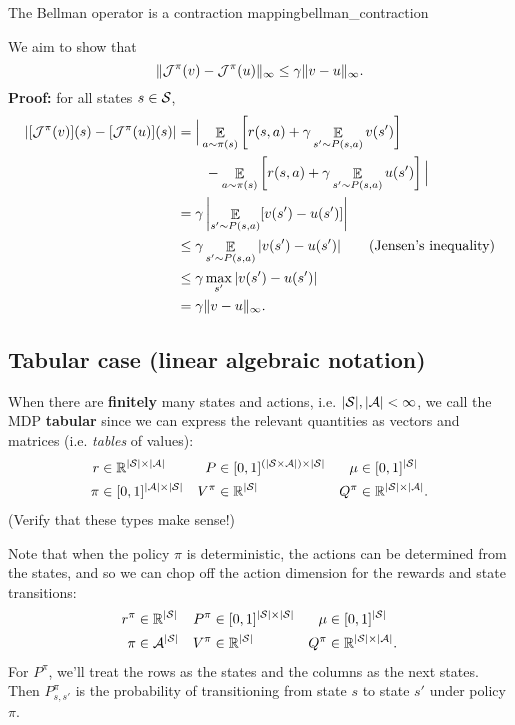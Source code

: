 \documentclass[../main/main]{subfiles}
\begin{document}
\begin{theorem}{The Bellman operator is a contraction mapping}{bellman_contraction}

We aim to show that
\[
    \|\bop^{\pi} (v) - \bop^{\pi} (u) \|_{\infty} \le \gamma \|v - u \|_{\infty}.
\]
\textbf{Proof:} for all states $s \in \S$,
\begin{align*}
|[\bop^{\pi} (v)](s) - [\bop^{\pi} (u)](s)|&= \Big| \mathop{\mathbb{E}}_{a \sim \pi(s)} \left[ r(s, a) + \gamma \mathop{\mathbb{E}}_{s' \sim P(s, a)} v(s') \right] \\
&\qquad - \mathop{\mathbb{E}}_{a \sim \pi(s)} \left[r(s, a) + \gamma \mathop{\mathbb{E}}_{s' \sim P(s, a)} u(s') \right] \Big| \\
&= \gamma \left|\mathop{\mathbb{E}}_{s' \sim P(s, a)} [v(s') - u(s')] \right| \\
&\le \gamma \mathop{\mathbb{E}}_{s' \sim P(s, a)}|v(s') - u(s')| \qquad \text{(Jensen's inequality)} \\
&\le \gamma \max_{s'} |v(s') - u(s')| \\
&= \gamma \|v - u \|_{\infty}.
\end{align*}

\end{theorem}

\subsection{Tabular case (linear algebraic notation)}

When there are \textbf{finitely} many states and actions, i.e. $|\S|, |\A| < \infty$, we call the MDP \textbf{tabular} since we can express the relevant quantities as vectors and matrices (i.e. \emph{tables} of values):
\begin{align*}
    r &\in \R^{|\S| \times |\A|} &
    P &\in [0, 1]^{(|\S \times \A|) \times |\S|} &
    \mu &\in [0, 1]^{|\S|} \\
    \pi &\in [0, 1]^{|\A| \times |\S|} &
    V^\pi &\in \R^{|\S|} &
    Q^\pi &\in \R^{|\S| \times |\A|}.
\end{align*}
(Verify that these types make sense!)

Note that when the policy $\pi$ is deterministic, the actions can be determined from the states, and so we can chop off the action dimension for the rewards and state transitions:
\begin{align*}
    r^{\pi} &\in \R^{|\S|} & P^{\pi} &\in [0, 1]^{|\S| \times |\S|} & \mu &\in [0, 1]^{|\S|} \\
    \pi &\in \A^{|\S|} & V^\pi &\in \R^{|\S|} & Q^\pi &\in \R^{|\S| \times |\A|}.
\end{align*}
For $P^\pi$, we'll treat the rows as the states and the columns as the next states. Then $P^\pi_{s, s'}$ is the probability of transitioning from state $s$ to state $s'$ under policy $\pi$.
\end{document}
